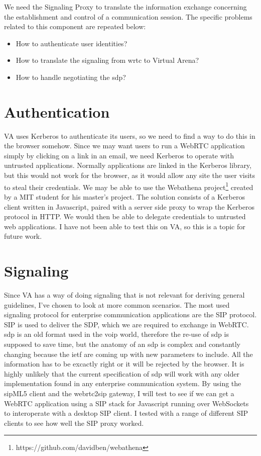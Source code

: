 We need the Signaling Proxy to translate the information exchange concerning the establishment and control of a communication session. The specific problems related to this component are repeated below:

\begin{itemize}
\item{How to authenticate user identities?}
\item{How to translate the signaling from \gls{wrtc} to Virtual Arena?}
\item{How to handle negotiating the \gls{sdp}?}
\end{itemize}

\section{Authentication}
VA uses Kerberos to authenticate its users, so we need to find a way to do this in the browser somehow. Since we may want users to run a WebRTC application simply by clicking on a link in an email, we need Kerberos to operate with untrusted applications. Normally applications are linked in the Kerberos library, but this would not work for the browser, as it would allow any site the user visits to steal their credentials\cite{webathena}. We may be able to use the Webathena project\footnote{https://github.com/davidben/webathena} created by a MIT student for his master's project\cite{webathena}. The solution consists of a Kerberos client written in Javascript, paired with a server side proxy to wrap the Kerberos protocol in HTTP. We would then be able to delegate credentials to untrusted web applications. I have not been able to test this on VA, so this is a topic for future work.

\section{Signaling}
Since VA has a way of doing signaling that is not relevant for deriving general guidelines, I've chosen to look at more common scenarios. The most used signaling protocol for enterprise communication applications are the SIP protocol. SIP is used to deliver the SDP, which we are required to exchange in WebRTC. \gls{sdp} is an old format used in the \gls{voip} world, therefore the re-use of \gls{sdp} is supposed to save time, but the anatomy of an \gls{sdp} is complex and constantly changing because the \gls{ietf} are coming up with new parameters to include. All the information has to be excactly right or it will be rejected by the browser. It is highly unlikely that the current specification of \gls{sdp} will work with any older implementation found in any enterprise communication system. By using the sipML5 client and the webrtc2sip gateway, I will test to see if we can get a WebRTC application using a SIP stack for Javascript running over WebSockets to interoperate with a desktop SIP client. I tested with a range of different SIP clients to see how well the SIP proxy worked.

